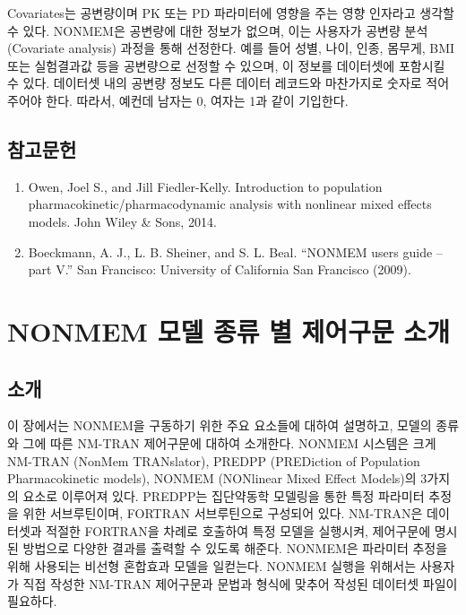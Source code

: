 \documentclass[
  10pt,
]{krantz}
\providecommand{\tightlist}{%
  \setlength{\itemsep}{0pt}\setlength{\parskip}{0pt}}
\begin{document}
Covariates는 공변량이며 PK 또는 PD 파라미터에 영향을 주는 영향 인자라고 생각할 수 있다. NONMEM은 공변량에 대한 정보가 없으며, 이는 사용자가 공변량 분석(Covariate analysis) 과정을 통해 선정한다. 예를 들어 성별, 나이, 인종, 몸무게, BMI 또는 실험결과값 등을 공변량으로 선정할 수 있으며, 이 정보를 데이터셋에 포함시킬 수 있다. 데이터셋 내의 공변량 정보도 다른 데이터 레코드와 마찬가지로 숫자로 적어주어야 한다. 따라서, 예컨데 남자는 0, 여자는 1과 같이 기입한다.

\hypertarget{uxcc38uxace0uxbb38uxd5cc}{%
\section{참고문헌}\label{uxcc38uxace0uxbb38uxd5cc}}

\begin{enumerate}
\def\labelenumi{\arabic{enumi}.}
\tightlist
\item
  Owen, Joel S., and Jill Fiedler-Kelly. Introduction to population pharmacokinetic/pharmacodynamic analysis with nonlinear mixed effects models. John Wiley \& Sons, 2014.
\item
  Boeckmann, A. J., L. B. Sheiner, and S. L. Beal. ``NONMEM users guide -- part V.'' San Francisco: University of California San Francisco (2009).
\end{enumerate}

\hypertarget{nonmem-uxbaa8uxb378-uxc885uxb958-uxbcc4-uxc81cuxc5b4uxad6cuxbb38-uxc18cuxac1c}{%
\chapter{NONMEM 모델 종류 별 제어구문 소개}\label{nonmem-uxbaa8uxb378-uxc885uxb958-uxbcc4-uxc81cuxc5b4uxad6cuxbb38-uxc18cuxac1c}}

\hypertarget{uxc18cuxac1c-1}{%
\section{소개}\label{uxc18cuxac1c-1}}

이 장에서는 NONMEM을 구동하기 위한 주요 요소들에 대하여 설명하고, 모델의 종류와 그에 따른 NM-TRAN 제어구문에 대하여
소개한다. NONMEM 시스템은 크게 NM-TRAN (NonMem TRANslator), PREDPP (PREDiction of
Population Pharmacokinetic models), NONMEM (NONlinear Mixed Effect
Models)의 3가지의 요소로 이루어져 있다. PREDPP는 집단약동학 모델링을 통한 특정 파라미터 추정을 위한 서브루틴이며,
FORTRAN 서브루틴으로 구성되어 있다. NM-TRAN은 데이터셋과 적절한 FORTRAN을 차례로 호출하여 특정 모델을
실행시켜, 제어구문에 명시된 방법으로 다양한 결과를 출력할 수 있도록 해준다. NONMEM은 파라미터 추정을 위해
사용되는 비선형 혼합효과 모델을 일컫는다. NONMEM 실행을 위해서는 사용자가 직접 작성한 NM-TRAN 제어구문과 문법과
형식에 맞추어 작성된 데이터셋 파일이 필요하다. 
\end{document}
